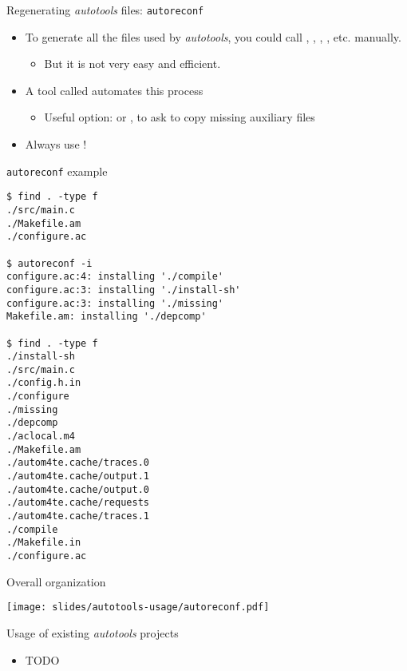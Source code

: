 \begin{frame}{Regenerating {\em autotools} files: {\tt autoreconf}}
  \begin{itemize}
  \item To generate all the files used by {\em autotools}, you could
    call , , ,
    , etc. manually.
    \begin{itemize}
    \item But it is not very easy and efficient.
    \end{itemize}
  \item A tool called  automates this process
    \begin{itemize}
    \item Useful option:  or , to ask
       to copy missing auxiliary files
    \end{itemize}
  \item Always use !
  \end{itemize}
\end{frame}

\begin{frame}[fragile]{{\tt autoreconf} example}

\begin{block}{}
{\tiny
\begin{verbatim}
$ find . -type f
./src/main.c
./Makefile.am
./configure.ac

$ autoreconf -i
configure.ac:4: installing './compile'
configure.ac:3: installing './install-sh'
configure.ac:3: installing './missing'
Makefile.am: installing './depcomp'

$ find . -type f
./install-sh
./src/main.c
./config.h.in
./configure
./missing
./depcomp
./aclocal.m4
./Makefile.am
./autom4te.cache/traces.0
./autom4te.cache/output.1
./autom4te.cache/output.0
./autom4te.cache/requests
./autom4te.cache/traces.1
./compile
./Makefile.in
./configure.ac
\end{verbatim}}
\end{block}

\end{frame}

\begin{frame}{Overall organization}

  \begin{center}
    \texttt{[image: slides/autotools-usage/autoreconf.pdf]}
  \end{center}

\end{frame}

\setuplabframe
{Usage of existing {\em autotools} projects}
{
  \begin{itemize}
  \item TODO
  \end{itemize}
}
